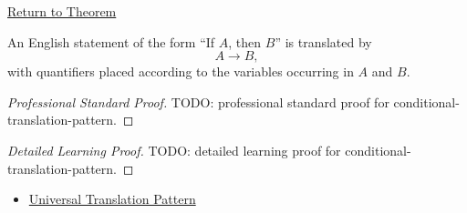 \newpage
{}
\label{prf:conditional-translation-pattern}

\begin{remark*}[Return]
\hyperref[prop:conditional-translation-pattern]{Return to Theorem}
\end{remark*}

\begin{proposition*}
An English statement of the form ``If \(A\), then \(B\)'' is translated by
\[
A\to B,
\]
with quantifiers placed according to the variables occurring in \(A\) and \(B\).
\end{proposition*}

\begin{proof}[Professional Standard Proof]
\LRAProofBodyStart
TODO: professional standard proof for conditional-translation-pattern.
\end{proof}

\begin{proof}[Detailed Learning Proof]
\LRAProofBodyStart
TODO: detailed learning proof for conditional-translation-pattern.
\end{proof}

\begin{remark*}
\end{remark*}

\begin{dependencies}
\begin{itemize}
  \item \hyperref[prop:universal-translation-pattern]{Universal Translation Pattern}
\end{itemize}
\end{dependencies}

\clearpage
